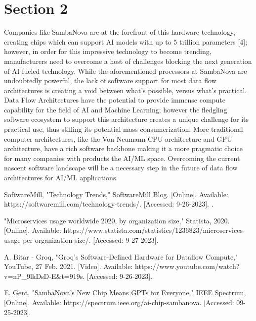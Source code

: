 \documentclass[11pt]{IEEEtran}
\begin{document}
\section{Section 2}
Companies like SambaNova are at the forefront of this hardware technology, creating chips which can support AI models with up to 5 trillion parameters [4]; however, in order for this impressive technology to become trending, manufacturers need to overcome a host of challenges blocking the next generation of AI fueled technology.  While the aforementioned processors at SambaNova are undoubtedly powerful, the lack of software support for most data flow architectures is creating a void between what's possible, versus what's practical.  Data Flow Architectures have the potential to provide immense compute capability for the field of AI and Machine Learning; however the fledgling software ecosystem to support this architecture creates a unique challenge for its practical use, thus stifling its potential mass consumerization.  More traditional computer architectures, like the Von Neumann CPU architecture and GPU architecture, have a rich software backbone making it a more pragmatic choice for many companies with products the AI/ML space.  Overcoming the current nascent software landscape will be a necessary step in the future of data flow architectures for AI/ML applications. 

\begin{thebibliography}{00}

 SoftwareMill, "Technology Trends," SoftwareMill Blog. [Online]. Available: https://softwaremill.com/technology-trends/. [Accessed: 9-26-2023].
.

 "Microservices usage worldwide 2020, by organization size," Statista, 2020. [Online]. Available: https://www.statista.com/statistics/1236823/microservices-usage-per-organization-size/. [Accessed: 9-27-2023].


 A. Bitar - Groq, "Groq’s Software-Defined Hardware for Dataflow Compute," YouTube, 27 Feb. 2021. [Video]. Available: https://www.youtube.com/watch?v=nP\_9lkDsD-E\&t=919s. [Accessed: 9-26-2023].

 E. Gent, "SambaNova’s New Chip Means GPTs for Everyone," IEEE Spectrum, [Online]. Available: https://spectrum.ieee.org/ai-chip-sambanova. [Accessed: 09-25-2023].

\end{thebibliography}
\end{document}
